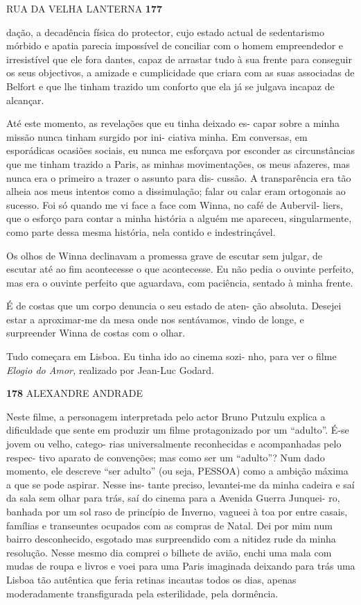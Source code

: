 RUA DA VELHA LANTERNA \textbf{177}

dação, a decadência física do protector, cujo estado actual de
sedentarismo mórbido e apatia parecia impossível de conciliar com o
homem empreendedor e irresistível que ele fora dantes, capaz de arrastar
tudo à sua frente para conseguir os seus objectivos, a amizade e
cumplicidade que criara com as suas associadas de Belfort e que lhe
tinham trazido um conforto que ela já se julgava incapaz de alcançar.

Até este momento, as revelações que eu tinha deixado es- capar sobre a
minha missão nunca tinham surgido por ini- ciativa minha. Em conversas,
em esporádicas ocasiões sociais, eu nunca me esforçava por esconder as
circunstâncias que me tinham trazido a Paris, as minhas movimentações,
os meus afazeres, mas nunca era o primeiro a trazer o assunto para dis-
cussão. A transparência era tão alheia aos meus intentos como a
dissimulação; falar ou calar eram ortogonais ao sucesso. Foi só quando
me vi face a face com Winna, no café de Aubervil- liers, que o esforço
para contar a minha história a alguém me apareceu, singularmente, como
parte dessa mesma história, nela contido e indestrinçável.

Os olhos de Winna declinavam a promessa grave de escutar sem julgar, de
escutar até ao fim acontecesse o que acontecesse. Eu não pedia o ouvinte
perfeito, mas era o ouvinte perfeito que aguardava, com paciência,
sentado à minha frente.

É de costas que um corpo denuncia o seu estado de aten- ção absoluta.
Desejei estar a aproximar-me da mesa onde nos sentávamos, vindo de
longe, e surpreender Winna de costas com o olhar.

Tudo começara em Lisboa. Eu tinha ido ao cinema sozi- nho, para ver o
filme \emph{Elogio do Amor, }realizado por Jean-Luc Godard.

\textbf{178 }ALEXANDRE ANDRADE

Neste filme, a personagem interpretada pelo actor Bruno Putzulu explica
a dificuldade que sente em produzir um filme protagonizado por um
``adulto''. É-se jovem ou velho, catego- rias universalmente
reconhecidas e acompanhadas pelo respec- tivo aparato de convenções; mas
como ser um ``adulto''? Num dado momento, ele descreve ``ser adulto''
(ou seja, PESSOA) como a ambição máxima a que se pode aspirar. Nesse
ins- tante preciso, levantei-me da minha cadeira e saí da sala sem olhar
para trás, saí do cinema para a Avenida Guerra Junquei- ro, banhada por
um sol raso de princípio de Inverno, vagueei à toa por entre casais,
famílias e transeuntes ocupados com as compras de Natal. Dei por mim num
bairro desconhecido, esgotado mas surpreendido com a nitidez rude da
minha resolução. Nesse mesmo dia comprei o bilhete de avião, enchi uma
mala com mudas de roupa e livros e voei para uma Paris imaginada
deixando para trás uma Lisboa tão autêntica que feria retinas incautas
todos os dias, apenas moderadamente transfigurada pela esterilidade,
pela dormência.


